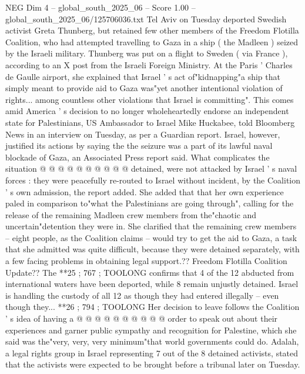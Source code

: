 \begin{textsample}{NEG Dim 4 – global\_south\_2025\_06 – Score 1.00 – global\_south\_2025\_06/125706036.txt}  \label{ex:f4_neg_108}
Tel Aviv on Tuesday deported Swedish activist Greta Thunberg, but retained few other members of the Freedom Flotilla Coalition, who had attempted travelling to Gaza in a ship ( the Madleen ) seized by the Israeli military.
Thunberg was put on a flight to Sweden ( via France ), according to an X post from the Israeli Foreign Ministry.
At the Paris ' Charles de Gaulle airport, she explained that Israel ' s act of"kidnapping"a ship that simply meant to provide aid to Gaza was"yet another intentional violation of rights... among countless other violations that Israel is committing".
This comes amid America ' s decision to no longer wholeheartedly endorse an independent state for Palestinians, US Ambassador to Israel Mike Huckabee, told Bloomberg News in an interview on Tuesday, as per a Guardian report.
Israel, however, justified its actions by saying the the seizure was a part of its lawful naval blockade of Gaza, an Associated Press report said.
What complicates the situation @ @ @ @ @ @ @ @ @ @ detained, were not attacked by Israel ' s naval forces : they were peacefully re-routed to Israel without incident, by the Coalition ' s own admission, the report added.
She added that that her own experience paled in comparison to"what the Palestinians are going through", calling for the release of the remaining Madleen crew members from the"chaotic and uncertain"detention they were in.
She clarified that the remaining crew members -- eight people, as the Coalition claims -- would try to get the aid to Gaza, a task that she admitted was quite difficult, because they were detained separately, with a few facing problems in obtaining legal support.??
Freedom Flotilla Coalition Update??
The **25 ; 767 ; TOOLONG confirms that 4 of the 12 abducted from international waters have been deported, while 8 remain unjustly detained.
Israel is handling the custody of all 12 as though they had entered illegally -- even though they... **26 ; 794 ; TOOLONG Her decision to leave follows the Coalition ' s idea of having a @ @ @ @ @ @ @ @ @ @ order to speak out about their experiences and garner public sympathy and recognition for Palestine, which she said was the"very, very, very minimum"that world governments could do.
Adalah, a legal rights group in Israel representing 7 out of the 8 detained activists, stated that the activists were expected to be brought before a tribunal later on Tuesday.

\end{textsample}
